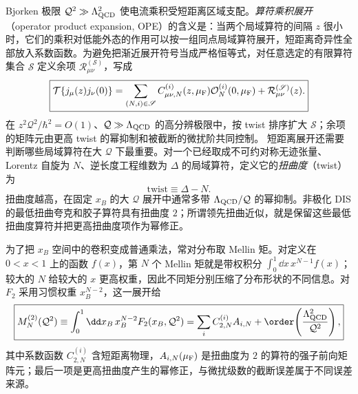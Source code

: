 Bjorken 极限 $\mathcal Q^2\gg\Lambda_{\rm QCD}^2$ 使电流乘积受短距离区域支配。\emph{算符乘积展开}（operator product expansion, OPE）的含义是：当两个局域算符的间隔 $z$ 很小时，它们的乘积对低能外态的作用可以按一组同点局域算符展开，短距离奇异性全部放入系数函数。为避免把渐近展开符号当成严格恒等式，对任意选定的有限算符集合 $\mathscr S$ 定义余项 $\mathcal R_{\mu\nu}^{(\mathscr S)}$，写成
\begin{equation}
 \boxed{
 \mathcal T\{j_\mu(z)j_\nu(0)\}
 =\sum_{(N,i)\in\mathscr S}C_{\mu\nu,N}^{(i)}(z,\mu_{\rm F})
 \mathcal O_N^{(i)}(0,\mu_{\rm F})
 +\mathcal R_{\mu\nu}^{(\mathscr S)}(z).}
 \label{eq:dis-current-product-ope-dp68}
\end{equation}
在 $z^2\mathcal Q^2/\hbar^2=O(1)$、$\mathcal Q\gg\Lambda_{\rm QCD}$ 的高分辨极限中，按 twist 排序扩大 $\mathscr S$；余项的矩阵元由更高 twist 的幂抑制和被截断的微扰阶共同控制。
短距离展开还需要判断哪些局域算符在大 $\mathcal Q$ 下最重要。对一个已经取成不可约对称无迹张量、Lorentz 自旋为 $N$、逆长度工程维数为 $\Delta$ 的局域算符，定义它的\emph{扭曲度}（twist）为
\begin{equation*}
 \text{twist}\equiv\Delta-N.
\end{equation*}
扭曲度越高，在固定 $x_B$ 的大 $\mathcal Q$ 展开中通常多带 $\Lambda_{\rm QCD}/\mathcal Q$ 的幂抑制。非极化 DIS 的最低扭曲夸克和胶子算符具有扭曲度 $2$；所谓领先扭曲近似，就是保留这些最低扭曲度算符并把更高扭曲度项作为幂修正。

为了把 $x_B$ 空间中的卷积变成普通乘法，常对分布取 Mellin 矩。对定义在 $0<x<1$ 上的函数 $f(x)$，第 $N$ 个 Mellin 矩就是带权积分 $\int_0^1\dd x\,x^{N-1}f(x)$；较大的 $N$ 给较大的 $x$ 更高权重，因此不同矩分别压缩了分布形状的不同信息。对 $F_2$ 采用习惯权重 $x_B^{N-2}$，这一展开给
\begin{equation}
 \boxed{
 M_N^{(2)}(\mathcal Q^2)
 \equiv\int_0^1\dd x_B\,x_B^{N-2}F_2(x_B,\mathcal Q^2)
 =\sum_i C_{2,N}^{(i)} A_{i,N}
 +\order\!\left(\frac{\Lambda_{\rm QCD}^2}{\mathcal Q^2}\right),}
 \label{eq:dis-ope-moment-factorization-dp13}
\end{equation}
其中系数函数 $C_{2,N}^{(i)}$ 含短距离物理，$A_{i,N}(\mu_{\rm F})$ 是扭曲度为 $2$ 的算符的强子前向矩阵元；最后一项是更高扭曲度产生的幂修正，与微扰级数的截断误差属于不同误差来源。

